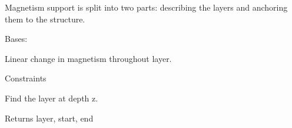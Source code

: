 \documentclass[letterpaper,10pt,english]{sphinxmanual}
\begin{document}
Magnetism support is split into two parts: describing the layers
and anchoring them to the structure.

\begin{fulllineitems}
\label{api/magnetic:refl1d.magnetic.FreeMagnetic}
Bases: {\hyperref[api/magnetic:refl1d.magnetic.MagneticLayer]{}}

Linear change in magnetism throughout layer.

\begin{fulllineitems}
\label{api/magnetic:refl1d.magnetic.FreeMagnetic.constraints}
Constraints

\end{fulllineitems}


\begin{fulllineitems}
\label{api/magnetic:refl1d.magnetic.FreeMagnetic.find}
Find the layer at depth z.

Returns layer, start, end

\end{fulllineitems}


\begin{fulllineitems}
\label{api/magnetic:refl1d.magnetic.FreeMagnetic.parameters}
\end{fulllineitems}


\begin{fulllineitems}
\label{api/magnetic:refl1d.magnetic.FreeMagnetic.profile}
\end{fulllineitems}


\begin{fulllineitems}
\label{api/magnetic:refl1d.magnetic.FreeMagnetic.render}
\end{fulllineitems}


\end{fulllineitems}
\end{document}
